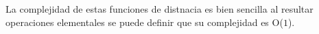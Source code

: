 La complejidad de estas funciones de distnacia es bien sencilla al resultar operaciones elementales se puede definir que su complejidad es O($1$).